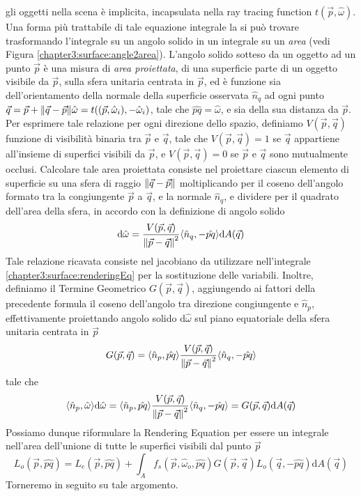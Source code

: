 gli oggetti nella scena \`e implicita, incapsulata nella ray tracing function $t(\vec{p}, \hat{\omega})$. Una forma pi\`u trattabile di tale equazione
integrale la si pu\`o trovare trasformando l'integrale su un angolo solido in un integrale su un \textit{area} (vedi Figura 
\ref{chapter3:surface:angle2area}). L'angolo solido sotteso da un oggetto ad un punto $\vec{p}$ \`e una misura di \textit{area proiettata}, di una 
superficie parte di un oggetto visibile da $\vec{p}$, sulla sfera unitaria centrata in $\vec{p}$, ed \`e funzione sia dell'orientamento della normale 
della superficie osservata $\hat{n}_q$ ad ogni punto $\vec{q}=\vec{p}+\norm{\vec{q}-\vec{p}}\hat{\omega}=t((\vec{p}, \hat{\omega}_i),-\hat{\omega}_i)$, 
tale che $\hat{pq}=\hat{\omega}$, e sia della sua distanza da $\vec{p}$. Per esprimere tale relazione per ogni direzione dello spazio, definiamo 
$V(\vec{p},\vec{q})$ funzione di visibilit\`a binaria tra $\vec{p}$ e $\vec{q}$, tale che $V(\vec{p},\vec{q})=1$ se $\vec{q}$ appartiene all'insieme 
di superfici visibili da $\vec{p}$, e $V(\vec{p},\vec{q})=0$ se $\vec{p}$ e $\vec{q}$ sono mutualmente occlusi. Calcolare tale area proiettata consiste
nel proiettare ciascun elemento di superficie su una sfera di raggio $\norm{\vec{q}-\vec{p}}$ moltiplicando per il coseno dell'angolo formato tra la 
congiungente $\vec{p}$ a $\vec{q}$, e la normale $\hat{n}_q$, e dividere per il quadrato dell'area della sfera, in accordo con la definizione di 
angolo solido
\begin{equation}
	\mathrm{d}\hat{\omega}=\frac{V(\vec{p},\vec{q})}{\norm{\vec{p}-\vec{q}}^2}\langle\hat{n}_q,-\hat{pq}\rangle\mathrm{d}A(\vec{q})
\end{equation}
Tale relazione ricavata consiste nel jacobiano da utilizzare nell'integrale \ref{chapter3:surface:renderingEq} per la sostituzione delle variabili.
Inoltre, definiamo il Termine Geometrico $G(\vec{p},\vec{q})$, aggiungendo ai fattori della precedente formula il coseno dell'angolo tra direzione 
congiungente e $\hat{n}_p$, effettivamente proiettando angolo solido $\mathrm{d}\hat{\omega}$ sul piano equatoriale della sfera unitaria
centrata in $\vec{p}$
\begin{equation}\label{chapter3:surface:geometricTerm}
	G(\vec{p},\vec{q}) = \langle\hat{n}_p,\hat{pq}\rangle\frac{V(\vec{p},\vec{q})}{\norm{\vec{p}-\vec{q}}^2}\langle\hat{n}_q,-\hat{pq}\rangle
\end{equation}
tale che
\begin{equation}
	\langle\hat{n}_p,\hat{\omega}\rangle\mathrm{d}\hat{\omega} = %
		\langle\hat{n}_p,\hat{pq}\rangle\frac{V(\vec{p},\vec{q})}{\norm{\vec{p}-\vec{q}}^2}\langle\hat{n}_q,-\hat{pq}\rangle = %
		G(\vec{p},\vec{q})\mathrm{d}A(\vec{q})
\end{equation}
Possiamo dunque riformulare la Rendering Equation per essere un integrale nell'area dell'unione di tutte le superfici visibili dal punto $\vec{p}$
\begin{equation}\label{chapter3:surface:areaRenderingEq}
	L_o(\vec{p},\hat{pq}) %
		= L_e(\vec{p},\hat{pq}) + \int_{A}f_s(\vec{p},\hat{\omega}_o,\hat{pq})G(\vec{p},\vec{q})L_o(\vec{q},-\hat{pq})\mathrm{d}A(\vec{q})
\end{equation}
Torneremo in seguito su tale argomento.
